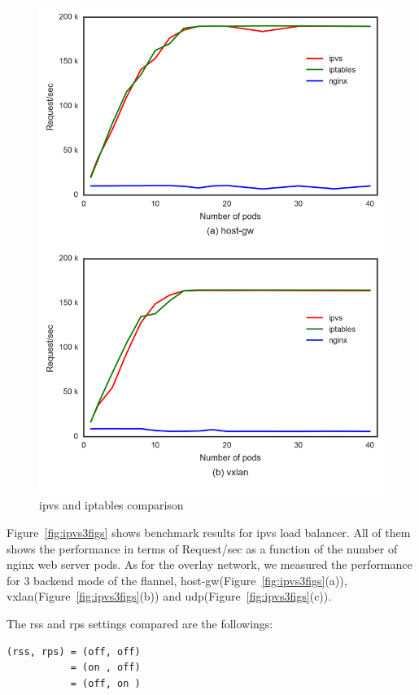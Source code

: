 \begin{figure}
\includegraphics[width=\columnwidth]{Figs/ipvs-iptables-nginx_2figs}
\caption{ipvs and iptables comparison}
\label{fig:ipvs-iptables-nginx_2figs}
\end{figure}


Figure~\ref{fig:ipvs3figs} shows benchmark results for ipvs load balancer. 
All of them shows the performance in terms of Request/sec as a function of the number of nginx web server pods.
As for the overlay network, we measured the performance for 3 backend mode of the flannel, 
host-gw(Figure~\ref{fig:ipvs3figs}(a)), vxlan(Figure~\ref{fig:ipvs3figs}(b)) and udp(Figure~\ref{fig:ipvs3figs}(c)).

The rss and rps settings compared are the followings: 

\begin{center}
\begin{minipage}{0.8\columnwidth}
\begin{verbatim}
(rss, rps) = (off, off)
           = (on , off)
           = (off, on )
\end{verbatim}
\end{minipage}
\end{center}


